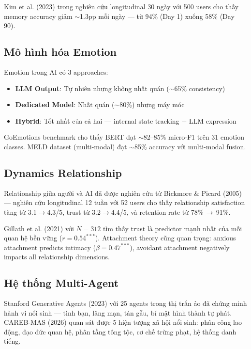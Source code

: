 \documentclass[10pt,leqno]{amsart}
\begin{document}
Kim et al. (2023) trong nghiên cứu longitudinal 30 ngày với 500 users cho thấy memory accuracy giảm $\sim$1.3pp mỗi ngày --- từ 94\% (Day 1) xuống 58\% (Day 90).

\subsection{Mô hình hóa Emotion}

Emotion trong AI có 3 approaches:
\begin{itemize}
    \item \textbf{LLM Output}: Tự nhiên nhưng không nhất quán ($\sim$65\% consistency)
    \item \textbf{Dedicated Model}: Nhất quán ($\sim$80\%) nhưng máy móc
    \item \textbf{Hybrid}: Tốt nhất của cả hai --- internal state tracking + LLM expression
\end{itemize}

GoEmotions benchmark cho thấy BERT đạt $\sim$82--85\% micro-F1 trên 31 emotion classes. MELD dataset (multi-modal) đạt $\sim$85\% accuracy với multi-modal fusion.

\subsection{Dynamics Relationship}

Relationship giữa người và AI đã được nghiên cứu từ Bickmore \& Picard (2005) --- nghiên cứu longitudinal 12 tuần với 52 users cho thấy relationship satisfaction tăng từ 3.1$\to$4.3/5, trust từ 3.2$\to$4.4/5, và retention rate từ 78\%\,$\to$\,91\%.

Gillath et al. (2021) với $N=312$ tìm thấy trust là predictor mạnh nhất của mối quan hệ bền vững ($r=0.54^{***}$). Attachment theory cũng quan trọng: anxious attachment predicts intimacy ($\beta=0.47^{***}$), avoidant attachment negatively impacts all relationship dimensions.

\subsection{Hệ thống Multi-Agent}

Stanford Generative Agents (2023) với 25 agents trong thị trấn ảo đã chứng minh hành vi nổi sinh --- tình bạn, lãng mạn, tán gẫu, bí mật hình thành tự phát. CAREB-MAS (2026) quan sát được 5 hiện tượng xã hội nổi sinh: phân công lao động, đạo đức quan hệ, phân tầng tông tộc, cơ chế trừng phạt, hệ thống danh tiếng.
\end{document}
